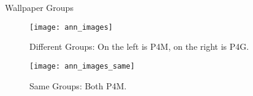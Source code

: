 \begin{block}{Wallpaper Groups}
\begin{figure}[!ht]
\centering
\texttt{[image: ann\_images]}
\caption{Different Groups: On the left is P4M, on the right is P4G.}
\label{P4GvP4M}
\end{figure}

\begin{figure}[!ht]
\centering
\texttt{[image: ann\_images\_same]}
\caption{Same Groups: Both P4M.}
\label{P4MvP4M}
\end{figure}
\end{block}